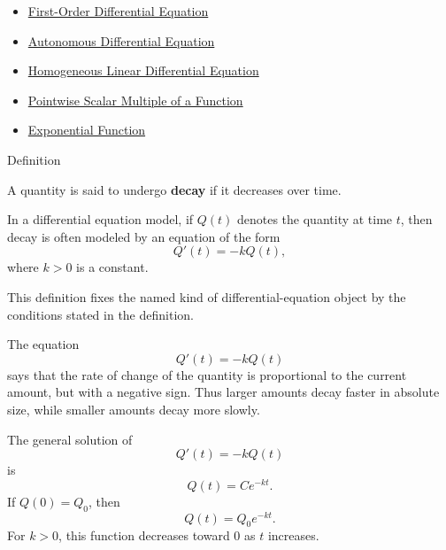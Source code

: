 \begin{dependencies}
\begin{itemize}
  \item \hyperref[def:ordinary-differential-equations-terminology-first-order-differential-equation]{First-Order Differential Equation}
  \item \hyperref[def:ordinary-differential-equations-terminology-autonomous-differential-equation]{Autonomous Differential Equation}
  \item \hyperref[def:ordinary-differential-equations-terminology-homogeneous-linear-differential-equation]{Homogeneous Linear Differential Equation}
  \item \hyperref[def:pointwise-scalar-multiple-of-a-function]{Pointwise Scalar Multiple of a Function}
  \item \hyperref[def:exponential]{Exponential Function}
\end{itemize}
\end{dependencies}


\begin{definitionbox}{Definition}
\begin{definition}[Decay]
\label{def:ordinary-differential-equations-models-decay}
A quantity is said to undergo \textbf{decay} if it decreases over time.

In a differential equation model, if $Q(t)$ denotes the quantity at time $t$, then decay is often modeled by an equation of the form
\[
Q'(t)=-kQ(t),
\]
where $k>0$ is a constant.
\end{definition}
\end{definitionbox}

\begin{remark*}
This definition fixes the named kind of differential-equation object by the
conditions stated in the definition.
\end{remark*}

\begin{remark*}[Interpretation]
The equation
\[
Q'(t)=-kQ(t)
\]
says that the rate of change of the quantity is proportional to the current amount, but with a negative sign. Thus larger amounts decay faster in absolute size, while smaller amounts decay more slowly.
\end{remark*}

\begin{remark*}[Examples]
The general solution of
\[
Q'(t)=-kQ(t)
\]
is
\[
Q(t)=Ce^{-kt}.
\]
If $Q(0)=Q_0$, then
\[
Q(t)=Q_0e^{-kt}.
\]
For $k>0$, this function decreases toward $0$ as $t$ increases.
\end{remark*}


